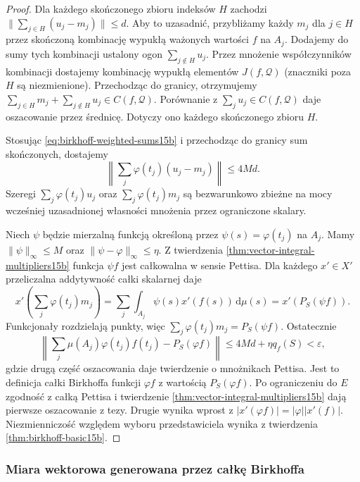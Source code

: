 \begin{proof}
Dla każdego skończonego zbioru indeksów $H$
zachodzi $\|\sum_{j\in H}(u_j-m_j)\|\le d$.
Aby to uzasadnić, przybliżamy każdy $m_j$ dla $j\in H$
przez skończoną kombinację wypukłą ważonych wartości
$f$ na $A_j$. Dodajemy do sumy tych kombinacji
ustalony ogon $\sum_{j\notin H}u_j$.
Przez mnożenie współczynników kombinacji dostajemy
kombinację wypukłą elementów $J(f,\mathcal Q)$
(znaczniki poza $H$ są niezmienione).
Przechodząc do granicy, otrzymujemy
$\sum_{j\in H}m_j+\sum_{j\notin H}u_j\in C(f,\mathcal Q)$.
Porównanie z $\sum_j u_j\in C(f,\mathcal Q)$
daje oszacowanie przez średnicę.
Dotyczy ono każdego skończonego zbioru $H$.

Stosując \eqref{eq:birkhoff-weighted-sums15b}
i przechodząc do granicy sum skończonych, dostajemy
\[
 \left\|\sum_j\varphi(t_j)(u_j-m_j)\right\|\le4Md.
\]
Szeregi $\sum_j\varphi(t_j)u_j$ oraz
$\sum_j\varphi(t_j)m_j$ są bezwarunkowo zbieżne
na mocy wcześniej uzasadnionej własności
mnożenia przez ograniczone skalary.

Niech $\psi$ będzie mierzalną funkcją określoną
przez $\psi(s)=\varphi(t_j)$ na $A_j$.
Mamy $\|\psi\|_\infty\le M$ oraz
$\|\psi-\varphi\|_\infty\le\eta$.
Z twierdzenia \ref{thm:vector-integral-multipliers15b}
funkcja $\psi f$ jest całkowalna w sensie Pettisa.
Dla każdego $x'\in X'$ przeliczalna addytywność
całki skalarnej daje
\[
 x'\left(\sum_j\varphi(t_j)m_j\right)
 =\sum_j\int_{A_j}\psi(s)x'(f(s))\,\mathrm d\mu(s)
 =x'(P_S(\psi f)).
\]
Funkcjonały rozdzielają punkty, więc
$\sum_j\varphi(t_j)m_j=P_S(\psi f)$.
Ostatecznie
\[
 \left\|\sum_j\mu(A_j)\varphi(t_j)f(t_j)
             -P_S(\varphi f)\right\|
 \le 4Md+\eta q_f(S)<\varepsilon,
\]
gdzie drugą część oszacowania daje twierdzenie
o mnożnikach Pettisa. Jest to definicja całki
Birkhoffa funkcji $\varphi f$ z wartością
$P_S(\varphi f)$. Po ograniczeniu do $E$
zgodność z całką Pettisa i twierdzenie
\ref{thm:vector-integral-multipliers15b} dają
pierwsze oszacowanie z tezy. Drugie wynika wprost
z $|x'(\varphi f)|=|\varphi||x'(f)|$.
Niezmienniczość względem wyboru przedstawiciela
wynika z twierdzenia \ref{thm:birkhoff-basic15b}.
\end{proof}

\subsubsection{Miara wektorowa generowana przez całkę Birkhoffa}

